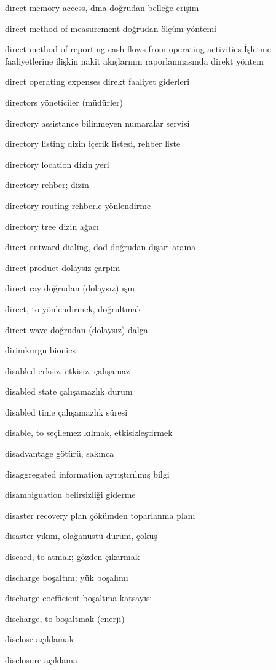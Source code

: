 \documentclass[12pt,fleqn]{article}\usepackage{../../common}
\begin{document}
direct memory access, dma doğrudan belleğe erişim

direct method of measurement doğrudan ölçüm yöntemi

direct method of reporting cash flows from operating activities İşletme faaliyetlerine ilişkin nakit akışlarının raporlanmasında direkt yöntem

direct operating expenses direkt faaliyet giderleri

directors yöneticiler (müdürler)

directory assistance bilinmeyen numaralar servisi

directory listing dizin içerik listesi, rehber liste

directory location dizin yeri

directory rehber; dizin

directory routing rehberle yönlendirme

directory tree dizin ağacı

direct outward dialing, dod doğrudan dışarı arama

direct product dolaysiz çarpim

direct ray doğrudan (dolaysız) ışın

direct, to yönlendirmek, doğrultmak

direct wave doğrudan (dolaysız) dalga

dirimkurgu bionics

disabled erksiz, etkisiz, çalışamaz

disabled state çalışamazlık durum

disabled time çalışamazlık süresi

disable, to seçilemez kılmak, etkisizleştirmek

disadvantage götürü, sakınca

disaggregated information ayrıştırılmış bilgi

disambiguation belirsizliği giderme

disaster recovery plan çökümden toparlanma planı

disaster yıkım, olağanüstü durum, çöküş

discard, to atmak; gözden çıkarmak

discharge boşaltım; yük boşalımı

discharge coefficient boşaltma katsayısı

discharge, to boşaltmak (enerji)

disclose açıklamak

disclosure açıklama
\end{document}
